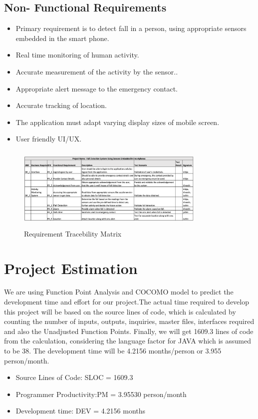 \documentclass[conference]{IEEEtran}
\begin{document}
\subsection{Non- Functional Requirements}
\begin{itemize}
\item Primary requirement is to detect fall in a person, using appropriate sensors embedded in the smart phone.
\item Real time monitoring of human activity.
\item Accurate measurement of the activity by the sensor..
\item Appropriate alert message to the emergency contact.
\item Accurate tracking of location.
\item The application must adapt varying display sizes of mobile screen.
\item User friendly UI/UX.\\
\end{itemize}

\begin{figure}
\centerline{\includegraphics[width=9cm,height=4cm]{RTM.png}}
\caption{Requirement Tracebility Matrix}
\label{fig2}
\end{figure}

\section{Project Estimation}

 We are using Function Point Analysis and COCOMO model to predict the development time and effort for our project.The actual time required to develop this project will be based on the source lines of code, which is calculated by  counting the number of inputs, outputs, inquiries, master files, interfaces required and also the Unadjusted Function Points. Finally, we will get 1609.3 lines of code from the calculation, considering the language factor for JAVA which is assumed to be 38. The development time will be 4.2156 months/person or 3.955 person/month.\cite{b4}
 \begin{itemize}
\item Source Lines of Code: SLOC = 1609.3
\item Programmer Productivity:PM = 3.95530 person/month
\item Development time: DEV = 4.2156 months
\end{itemize}
\end{document}
